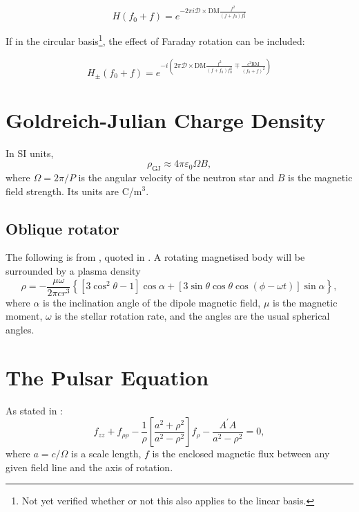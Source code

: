 \documentclass{book}
\begin{document}
\begin{equation}
    H(f_0 + f) = e^{-2\pi i \mathcal{D}\times\text{DM}\frac{f^2}{(f+f_0) f_0^2}}
\end{equation}

If in the circular basis\footnote{Not yet verified whether or not this also applies to the linear basis.}, the effect of Faraday rotation can be included:

\begin{equation}
    H_\pm(f_0 + f) = e^{-i \left(2\pi\mathcal{D}\times\text{DM}\frac{f^2}{(f+f_0) f_0^2} \mp \frac{c^2\text{RM}}{(f_0+f)^2}\right)}
\end{equation}

\section{Goldreich-Julian Charge Density}

In SI units,
\begin{equation}
    \rho_\text{GJ} \approx 4\pi\varepsilon_0\Omega B,
\end{equation}
where $\Omega = 2\pi/P$ is the angular velocity of the neutron star and $B$ is the magnetic field strength.
Its units are C/m$^3$.

\subsection{Oblique rotator}

The following is from \citet{Hones1965}, quoted in \citet{Michel2004}.
A rotating magnetised body will be surrounded by a plasma density
\begin{equation}
    \rho = -\frac{\mu\omega}{2\pi cr^3} \left\{ [ 3 \cos^2\theta - 1 ] \cos\alpha + \left[ 3 \sin\theta \cos\theta \cos(\phi - \omega t) \right] \sin\alpha \right \},
\end{equation}
where $\alpha$ is the inclination angle of the dipole magnetic field, $\mu$ is the magnetic moment, $\omega$ is the stellar rotation rate, and the angles are the usual spherical angles.

\section{The Pulsar Equation}

As stated in \citet{Michel1982}:
\begin{equation}
    f_{zz} + f_{\rho\rho} - \frac{1}{\rho}\left[\frac{a^2 + \rho^2}{a^2 - \rho^2}\right] f_\rho -
    \frac{A^\prime A}{a^2 - \rho^2} = 0,
\end{equation}
where $a = c/\Omega$ is a scale length, $f$ is the enclosed magnetic flux between any given field line and the axis of rotation.
\end{document}
